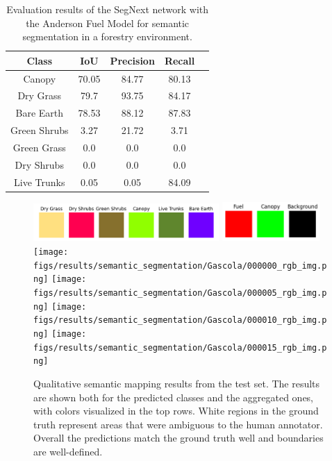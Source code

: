 \begin{table}[ht!]
    \centering
\begin{tabular}{ccccc}
\toprule
\textbf{Class} & \textbf{IoU} & \textbf{Precision} & \textbf{Recall} \\ \midrule
Canopy & 70.05 & 84.77 & 80.13 \\
Dry Grass & 79.7 & 93.75 & 84.17 \\
Bare Earth & 78.53 & 88.12 & 87.83 \\
Green Shrubs & 3.27 & 21.72 & 3.71 \\
Green Grass & 0.0 & 0.0 & 0.0 \\
Dry Shrubs & 0.0 & 0.0 & 0.0 \\
Live Trunks & 0.05 & 0.05 & 84.09 \\
\bottomrule
\end{tabular}
\caption{Evaluation results of the SegNext \cite{Guo2022SegNeXt:Segmentation} network with the Anderson Fuel Model \cite{anderson1981aids} for semantic segmentation in a forestry environment.}
\label{tab:results:semantic_eval}
\end{table}


\begin{figure}[h!]
   \centering
   \includegraphics[width=0.63\textwidth]{figs/results/semantic_segmentation/Gascola/safeforest_all_classes_flat.png}
   \includegraphics[width=0.33\textwidth]{figs/results/semantic_segmentation/Gascola/safeforest_classmap_compressed_flat.png}
   \texttt{[image: figs/results/semantic\_segmentation/Gascola/000000\_rgb\_img.png]}
   \vspace{0pt}
   \texttt{[image: figs/results/semantic\_segmentation/Gascola/000005\_rgb\_img.png]}
   \vspace{0pt}
   \texttt{[image: figs/results/semantic\_segmentation/Gascola/000010\_rgb\_img.png]}
   \vspace{0pt}
   \texttt{[image: figs/results/semantic\_segmentation/Gascola/000015\_rgb\_img.png]}
   \vspace{0pt}
   \caption{
   Qualitative semantic mapping results from the test set. The results are shown both for the predicted classes and the aggregated ones, with colors visualized in the top rows.
   White regions in the ground truth represent areas that were ambiguous to the human annotator. Overall the predictions match the ground truth well and boundaries are well-defined. 
   }
   \label{fig:results:semantic_gascola_qualitative}                %
\end{figure}

